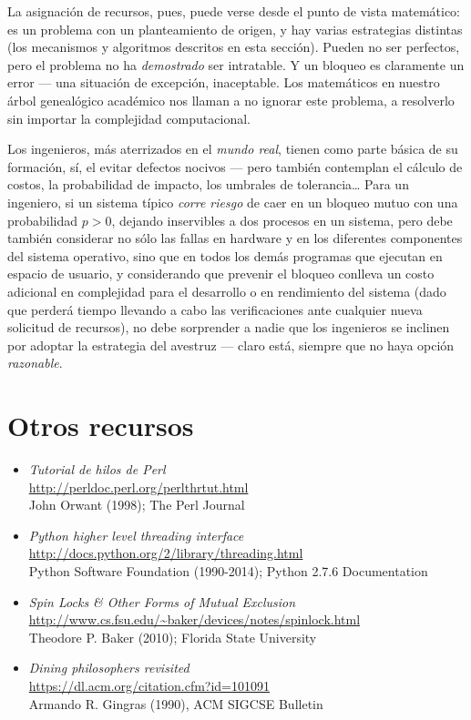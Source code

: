 \documentclass[11pt,fleqn]{book} %
\newcommand{\otrorec}[1]{ \\ {\small \url{#1}} \\ }
\begin{document}
La asignación de recursos, pues, puede verse desde el punto de vista
matemático: es un problema con un planteamiento de origen, y hay
varias estrategias distintas (los mecanismos y algoritmos descritos en
esta sección). Pueden no ser perfectos, pero el problema no ha
\emph{demostrado} ser intratable. Y un bloqueo es claramente un error — una
situación de excepción, inaceptable. Los matemáticos en nuestro árbol
genealógico académico nos llaman a no ignorar este problema, a
resolverlo sin importar la complejidad computacional.

Los ingenieros, más aterrizados en el \emph{mundo real}, tienen como parte
básica de su formación, sí, el evitar defectos nocivos — pero también
contemplan el cálculo de costos, la probabilidad de impacto, los
umbrales de tolerancia\ldots{} Para un ingeniero, si un sistema típico
\emph{corre riesgo} de caer en un bloqueo mutuo con una probabilidad $p >
0$, dejando inservibles a dos procesos en un sistema, pero debe
también considerar no sólo las fallas en hardware y en los diferentes
componentes del sistema operativo, sino que en todos los demás
programas que ejecutan en espacio de usuario, y considerando que
prevenir el bloqueo conlleva un costo adicional en complejidad para el
desarrollo o en rendimiento del sistema (dado que perderá tiempo
llevando a cabo las verificaciones ante cualquier nueva solicitud de
recursos), no debe sorprender a nadie que los ingenieros se inclinen
por adoptar la estrategia del avestruz — claro está, siempre que no
haya opción \emph{razonable}.
\section{Otros recursos}
\label{sec-3-5}


\begin{itemize}
\item \emph{Tutorial de hilos de Perl}
  \otrorec{http://perldoc.perl.org/perlthrtut.html}
  John Orwant (1998); The Perl Journal
\item \emph{Python higher level threading interface}
  \otrorec{http://docs.python.org/2/library/threading.html}
  Python Software Foundation (1990-2014); Python 2.7.6 Documentation
\item \emph{Spin Locks \& Other Forms of Mutual Exclusion}
  \otrorec{http://www.cs.fsu.edu/~baker/devices/notes/spinlock.html}
  Theodore P. Baker (2010); Florida State University
\item \emph{Dining philosophers revisited}
  \otrorec{https://dl.acm.org/citation.cfm?id=101091}
  Armando R. Gingras (1990), ACM SIGCSE Bulletin
\end{itemize}
\end{document}
